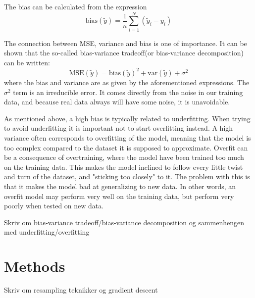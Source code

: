 \documentclass[a4paper,12pt]{article}
\begin{document}
The bias can be calculated from the expression
\begin{equation}
\text{bias}(\tilde{y})=\frac{1}{n}\sum_{i=1}^N(\tilde{y}_i - y_i)
\end{equation}

The connection between MSE, variance and bias is one of importance. It can be shown that the so-called bias-variance tradeoff(or bias-variance decomposition) can be written:
\begin{equation}
\text{MSE}(\tilde{y})=\text{bias}(\tilde{y})^2 + \text{var}(\tilde{y}) +\sigma^2
\end{equation}
where the bias and variance are as given by the aforementioned expressions. The $\sigma^2$ term is an irreducible error. It comes directly from the noise in our training data, and because real data always will have some noise, it is unavoidable.\newline

As mentioned above, a high bias is typically related to underfitting. When trying to avoid underfitting it is important not to start overfitting instead.
A high variance often corresponds to overfitting of the model, meaning that the model is too complex compared to the dataset it is supposed to approximate. Overfit can be a consequence of overtraining, where the model have been trained too much on the training data. This makes the model inclined to follow every little twist and turn of the dataset, and "sticking too closely" to it. The problem with this is that it makes the model bad at generalizing to new data. In other words, an overfit model may perform very well on the training data, but perform very poorly when tested on new data.


Skriv om bias-variance tradeoff/bias-variance decomposition og sammenhengen med underfitting/overfitting

\section{Methods}
Skriv om resampling teknikker og gradient descent
\end{document}
